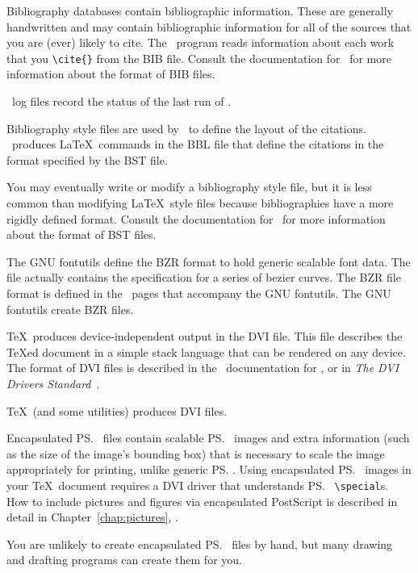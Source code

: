 \begin{iplist}{.25in}
\extitem [bib] Bibliography databases contain bibliographic information.
These are generally handwritten and may contain bibliographic information
for all of the sources that you are (ever) likely to cite.  The \BibTeX\
program reads information about each work that you \verb|\cite{}| from
the BIB file.  Consult the documentation for \BibTeX\ for more information
about the format of BIB files.

\extitem [blg] \BibTeX\ log files record the status of the last run of
\BibTeX.

\extitem [bst] Bibliography style files are used by \BibTeX\ to define the layout
of the citations.  \BibTeX\ produces \LaTeX\ commands in the BBL file that
define the citations in the format specified by the BST file.  

You may eventually write or modify a bibliography style file, but it is less
common than modifying \LaTeX\ style files because bibliographies
have a more rigidly defined format.  Consult the documentation for \BibTeX\ for
more information about the format of BST files.

\extitem [bzr] The GNU fontutils define the BZR format to hold
generic scalable font data.  The file actually contains the specification
for a series of bezier curves.  The BZR file format is defined in
the \TeXinfo\ pages that accompany the GNU fontutils.
The GNU fontutils create BZR files.

\newpage
\extitem [dvi] \TeX\ produces device-independent output in the DVI file.
This file describes the \TeX{}ed document in a simple stack language that can
be rendered on any device.  The format of DVI files is described in the
\web\ documentation for \program{DVItype}, or in {\em The DVI Drivers
Standard}~\cite{dvi:standard}. 

\TeX\ (and some  utilities) produces DVI files.

\extitem [epsf] Encapsulated \ps\ files contain scalable \ps\ images and extra information (such as the size of
the image's bounding box) that is necessary to scale the image appropriately
for printing, unlike generic \ps.  Using encapsulated \ps\ images in your \TeX\ document
requires a DVI driver that understands \ps\ \verb|\special|s.  How to include
pictures and figures via encapsulated PostScript is described
in detail in Chapter~\ref{chap:pictures}, {\it {}}.

You are unlikely to create encapsulated \ps\ files by hand, but many
drawing and drafting programs can create them for you.


\end{iplist}
